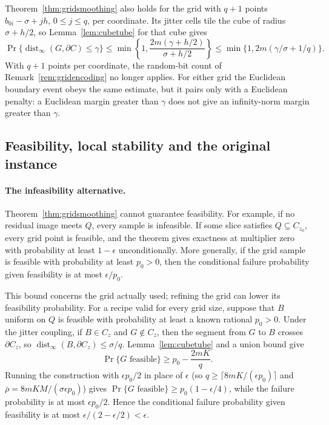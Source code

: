\begin{remark}\label{rem:endpointgrid}
Theorem~\ref{thm:gridsmoothing} also holds for the grid with $q+1$ points
$b_{0i}-\sigma+jh$, $0\le j\le q$, per coordinate. Its jitter cells tile
the cube of radius $\sigma+h/2$, so Lemma~\ref{lem:cubetube} for that cube
gives
\[
 \Pr\{\operatorname{dist}_\infty(G,\partial C)\le\gamma\}
 \le\min\left\{1,\frac{2m(\gamma+h/2)}{\sigma+h/2}\right\}
 \le\min\{1,2m(\gamma/\sigma+1/q)\}.
\]
With $q+1$ points per coordinate, the random-bit count of
Remark~\ref{rem:gridencoding} no longer applies. For either grid the
Euclidean boundary event obeys the same estimate, but it pairs only with
a Euclidean penalty: a Euclidean margin greater than $\gamma$ does not
give an infinity-norm margin greater than $\gamma$.
\end{remark}

\subsection{Feasibility, local stability and the original instance}
\label{sec:perturbation-stability}
\paragraph{The infeasibility alternative.}
Theorem~\ref{thm:gridsmoothing} cannot guarantee feasibility. For
example, if no residual image meets $Q$, every sample is infeasible. If
some slice satisfies $Q\subseteq C_{z_0}$, every grid point is feasible,
and the theorem gives exactness at multiplier zero with probability at
least $1-\epsilon$ unconditionally. More generally, if the grid sample is
feasible with probability at least $p_0>0$, then the conditional failure
probability given feasibility is at most $\epsilon/p_0$.

This bound concerns the grid actually used; refining the grid can lower
its feasibility probability. For a recipe valid for every grid size,
suppose that $B$ uniform on $Q$ is feasible with probability at least a
known rational $p_0>0$. Under the jitter coupling, if $B\in C_z$ and $G\notin C_z$,
then the segment from $G$ to $B$ crosses $\partial C_z$, so
$\operatorname{dist}_\infty(B,\partial C_z)\le\sigma/q$.
Lemma~\ref{lem:cubetube} and a union bound give
\[
 \Pr\{G\text{ feasible}\}\ge p_0-\frac{2mK}q .
\]
Running the construction with $\epsilon p_0/2$ in place of $\epsilon$
(so $q\ge\lceil8mK/(\epsilon p_0)\rceil$ and $\bar\rho=8mKM/(\sigma\epsilon p_0)$)
gives $\Pr\{G\text{ feasible}\}\ge p_0(1-\epsilon/4)$, while the failure
probability is at most $\epsilon p_0/2$. Hence the conditional failure
probability given feasibility is at most
$\epsilon/(2-\epsilon/2)<\epsilon$.

